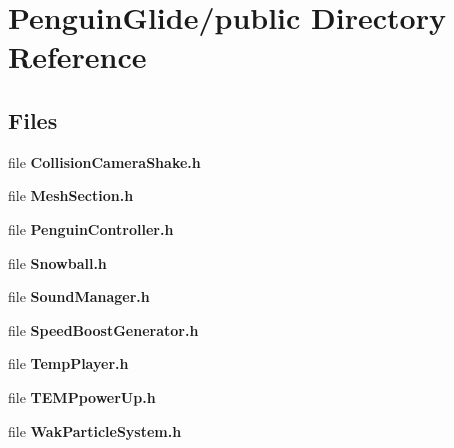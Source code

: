 \section{Penguin\+Glide/public Directory Reference}
\label{dir_bd159511ae8588cbf9f174950d0167ca}
\subsection*{Files}
\begin{DoxyCompactItemize}
\item 
file \textbf{ Collision\+Camera\+Shake.\+h}
\item 
file \textbf{ Mesh\+Section.\+h}
\item 
file \textbf{ Penguin\+Controller.\+h}
\item 
file \textbf{ Snowball.\+h}
\item 
file \textbf{ Sound\+Manager.\+h}
\item 
file \textbf{ Speed\+Boost\+Generator.\+h}
\item 
file \textbf{ Temp\+Player.\+h}
\item 
file \textbf{ T\+E\+M\+Ppower\+Up.\+h}
\item 
file \textbf{ Wak\+Particle\+System.\+h}
\end{DoxyCompactItemize}
